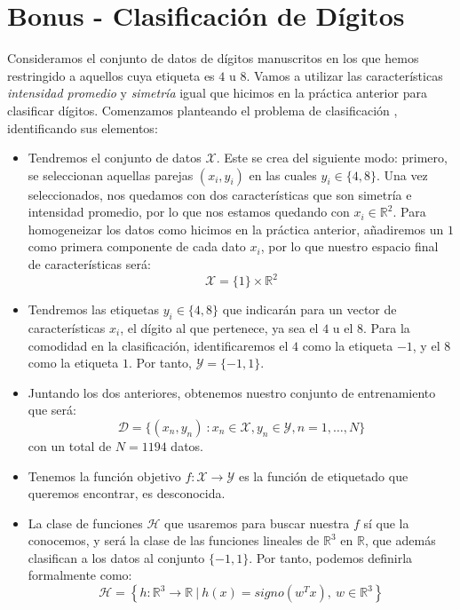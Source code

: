\documentclass[12pt]{article}
\begin{document}
{\section*{Bonus - Clasificación de Dígitos}

Consideramos el conjunto de datos de dígitos manuscritos en los que hemos restringido a aquellos cuya etiqueta es $4$ u $8$. Vamos a utilizar las características \emph{intensidad promedio} y \emph{simetría} igual que hicimos en la práctica anterior para clasificar dígitos. Comenzamos planteando el problema de clasificación , identificando sus elementos:
\begin{itemize}
\item Tendremos el conjunto de datos $\mathcal X$. Este se crea del siguiente modo: primero, se seleccionan aquellas parejas $(x_i,y_i)$ en las cuales $y_i \in \{4,8\}$. Una vez seleccionados, nos quedamos con dos características que son simetría e intensidad promedio, por lo que nos estamos quedando con $x_i \in \mathbb R^2$. Para homogeneizar los datos como hicimos en la práctica anterior, añadiremos un $1$ como primera componente de cada dato $x_i$, por lo que nuestro espacio final de características será:
$$
\mathcal X = \{1\} \times \mathbb R^2
$$
\item Tendremos las etiquetas $y_i \in \{4,8\}$ que indicarán para un vector de características $x_i$, el dígito al que pertenece, ya sea el $4$ u el $8$. Para la comodidad en la clasificación, identificaremos el $4$ como la etiqueta $-1$, y el $8$ como la etiqueta $1$. Por tanto, $\mathcal Y = \{-1,1\}$.

\item Juntando los dos anteriores, obtenemos nuestro conjunto de entrenamiento que será:
$$
\mathcal D = \{(x_n,y_n) \ : x_n \in \mathcal X, y_n \in \mathcal Y, n = 1,\dots,N\}
$$
con un total de $N = 1194$ datos.

\item Tenemos la función objetivo $f: \mathcal X \to \mathcal Y$ es la función de etiquetado que queremos encontrar, es desconocida. 

\item La clase de funciones $\mathcal H$ que usaremos para buscar nuestra $f$ sí que la conocemos, y será la clase de las funciones lineales de $\mathbb R^3$ en $\mathbb R$, que además clasifican a los datos al conjunto $\{-1,1\}$. Por tanto, podemos definirla formalmente como:
$$
\mathcal H = \left\{h : \mathbb R^3 \to \mathbb R \ | \ h(x) = signo(w^T x), \ w \in \mathbb R^3\right\}
$$


\end{itemize}}
\end{document}
